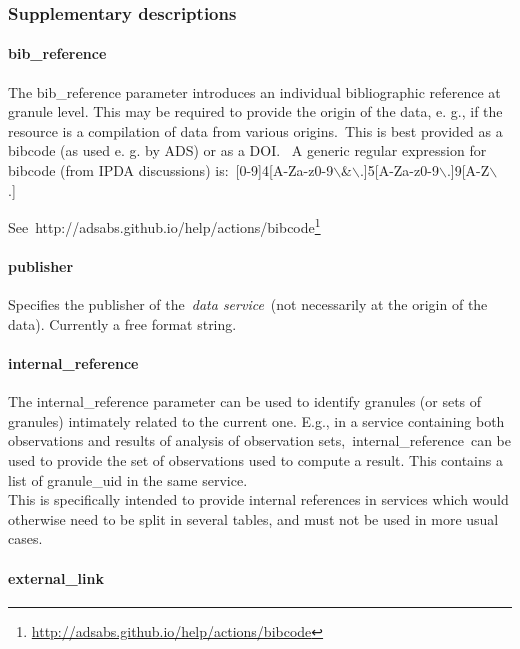 \documentclass[11pt,a4paper]{ivoa}
\begin{document}
\subsubsection{Supplementary descriptions\\}

\paragraph{bib\_reference}

The bib\_reference parameter introduces an individual bibliographic reference at granule level. This may be required to provide the origin of the data, e. g., if the resource is a compilation of data from various origins. This is best provided as a bibcode (as used e. g. by ADS) or as a DOI.  A generic regular expression for bibcode (from IPDA discussions) is: [0-9]{4}[A-Za-z0-9$\backslash$\&$\backslash$.]{5}[A-Za-z0-9$\backslash$.]{9}[A-Z$\backslash$.] 

See http://adsabs.github.io/help/actions/bibcode\footnote{\url{http://adsabs.github.io/help/actions/bibcode}}

\paragraph{publisher}

Specifies the publisher of the \emph{data service} (not necessarily at the origin of the data). Currently a free format string.\\

\paragraph{internal\_reference}

The internal\_reference parameter can be used to identify granules (or sets of granules) intimately related to the current one. E.g., in a service containing both observations and results of analysis of observation sets, internal\_reference can be used to provide the set of observations used to compute a result. This contains a list of granule\_uid in the same service.\\This is specifically intended to provide internal references in services which would otherwise need to be split in several tables, and must not be used in more usual cases. 

\paragraph{external\_link}
\end{document}
